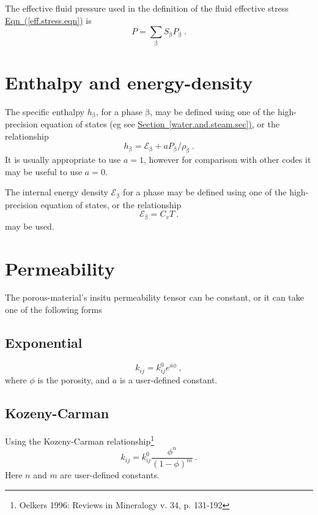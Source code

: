 \documentclass[12pt]{report}
\def\phase{\mathrm{\beta}}
\def\energydens{\mathcal{E}}
\begin{document}
The effective fluid pressure used in the definition of the fluid
effective stress \hyperref[eff.stress.eqn]{Eqn~(\ref*{eff.stress.eqn})} is
\begin{equation}
P = \sum_{\phase} S_{\phase}P_{\phase} \ .
\end{equation}

\section{Enthalpy and energy-density}

The specific enthalpy $h_{\phase}$, for a phase $\phase$, may be
defined using one of the high-precision equation of states (eg see
\hyperref[water.and.steam.sec]{Section~\ref*{water.and.steam.sec})},
or the relationship
\begin{equation}
h_{\phase} = \energydens_{\phase} + a P_{\phase}/\rho_{\phase} \ .
\end{equation}
It is usually appropriate to use $a=1$, however for comparison with
other codes it may be useful to use $a=0$.

The internal energy density $\energydens_{\phase}$ for a phase may be
defined using one of the high-precision equation of states, or the
relationship
\begin{equation}
\energydens_{\phase} = C_{v}T \ .
\end{equation}
may be used.


\section{Permeability}
\label{perm.sec}

The porous-material's insitu permeability tensor can be constant, or
it can take one of the following forms

\subsection{Exponential}

\begin{equation}
k_{ij} = k_{ij}^{0} e^{a\phi} \ ,
\end{equation}
where $\phi$ is the porosity, and $a$ is a user-defined constant.

\subsection{Kozeny-Carman}

Using the Kozeny-Carman relationship\footnote{Oelkers
1996: Reviews in Mineralogy v. 34, p. 131-192}
\begin{equation}
k_{ij} = k_{ij}^{0} \frac{\phi^{n}}{(1 - \phi)^{m}} \ .
\end{equation}
Here $n$ and $m$ are user-defined constants.
\end{document}
